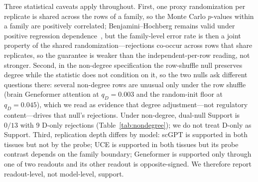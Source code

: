 \documentclass[fleqn,10pt,lineno]{wlpeerj}
\begin{document}
Three statistical caveats apply throughout. First, one proxy randomization per replicate is shared
across the rows of a family, so the Monte Carlo $p$-values within a family are positively
correlated; Benjamini--Hochberg remains valid under positive regression dependence~\citep{benjamini2001control}, but the
family-level error rate is then a joint property of the shared randomization---rejections
co-occur across rows that share replicates, so the guarantee is weaker than the independent-per-row
reading, not stronger. Second, in the
non-degree specification the row-shuffle null preserves degree while the statistic does not
condition on it, so the two nulls ask different questions there: several non-degree rows are
unusual only under the row shuffle (brain Geneformer attention at $q_D=0.003$ and the
random-init floor at $q_D=0.045$), which we read
as evidence that degree adjustment---not regulatory content---drives that null's rejections.
Under non-degree, dual-null Support is $0/13$ with 9 D-only rejections
(Table~\ref{tab:nondegree}); we do not treat D-only as Support.
Third, replication depth differs by model: scGPT is supported in both tissues but not by the
probe; UCE is supported in both tissues but its probe contrast depends on the family boundary;
Geneformer is supported only through one of two readouts and its other readout is opposite-signed.
We therefore report readout-level, not model-level, support.
\end{document}
